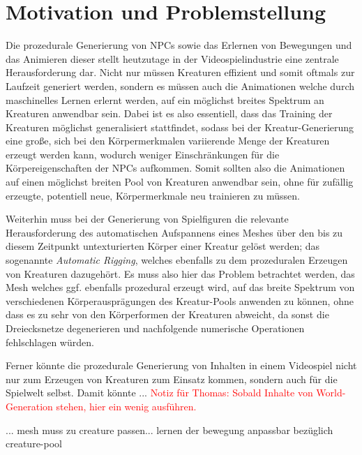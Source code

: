\section{Motivation und Problemstellung}

Die prozedurale Generierung von NPCs sowie das Erlernen von Bewegungen und das Animieren dieser stellt heutzutage in der Videospielindustrie eine zentrale Herausforderung dar. Nicht nur müssen Kreaturen effizient und somit oftmals zur Laufzeit generiert werden, sondern es müssen auch die Animationen welche durch maschinelles Lernen erlernt werden, auf ein möglichst breites Spektrum an Kreaturen anwendbar sein. Dabei ist es also essentiell, dass das Training der Kreaturen möglichst generalisiert stattfindet, sodass bei der Kreatur-Generierung eine große, sich bei den Körpermerkmalen variierende Menge der Kreaturen erzeugt werden kann, wodurch weniger Einschränkungen für die Körpereigenschaften der NPCs aufkommen. Somit sollten also die Animationen auf einen möglichst breiten Pool von Kreaturen anwendbar sein, ohne für zufällig erzeugte, potentiell neue, Körpermerkmale neu trainieren zu müssen.

Weiterhin muss bei der Generierung von Spielfiguren die relevante Herausforderung des automatischen Aufspannens eines Meshes über den bis zu diesem Zeitpunkt untexturierten Körper einer Kreatur gelöst werden; das sogenannte \textit{Automatic Rigging}, welches ebenfalls zu dem prozeduralen Erzeugen von Kreaturen dazugehört. Es muss also hier das Problem betrachtet werden, das Mesh welches ggf. ebenfalls prozedural erzeugt wird, auf das breite Spektrum von verschiedenen Körperausprägungen des Kreatur-Pools anwenden zu können, ohne dass es zu sehr von den Körperformen der Kreaturen abweicht, da sonst die Dreiecksnetze degenerieren und nachfolgende numerische Operationen fehlschlagen würden.

Ferner könnte die prozedurale Generierung von Inhalten in einem Videospiel nicht nur zum Erzeugen von Kreaturen zum Einsatz kommen, sondern auch für die Spielwelt selbst. Damit könnte ... \textcolor{red}{Notiz für Thomas: Sobald Inhalte von World-Generation stehen, hier ein wenig ausführen.}


  ... mesh muss zu creature passen... lernen der bewegung anpassbar bezüglich creature-pool